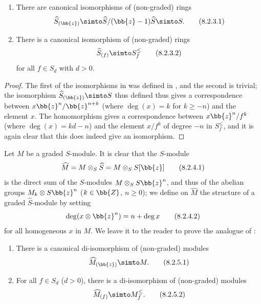 \begin{lemma}[8.2.3]
\label{II.8.2.3}
\begin{enumerate}
  \item[\rm{(i)}] There are canonical isomorphisms of (non-graded) rings
    \[
    \label{II.8.2.3.1}
      \widehat{S}_{(\bb{z})}
      \simto
      \widehat{S}/(\bb{z}-1)\widehat{S}
      \simto
      S.
    \tag{8.2.3.1}
    \]
  \item[\rm{(ii)}] There is a canonical isomorphism of (non-graded) rings
    \[
    \label{II.8.2.3.2}
      \widehat{S}_{(f)} \simto S_f^\leq
    \tag{8.2.3.2}
    \]
    for all $f\in S_d$ with $d>0$.
\end{enumerate}
\end{lemma}

\begin{proof}
The first of the isomorphisms in  was defined in , and the second is trivial;
the isomorphism $\widehat{S}_{(\bb{z})} \simto S$ thus defined thus gives a correspondence between $x\bb{z}^n/\bb{z}^{n+k}$ (where $\deg(x) = k$ for $k\geq -n$) and the element $x$.
The homomorphism  gives a correspondence between $x\bb{z}^n/f^k$ (where $\deg(x) = kd-n$) and the element $x/f^k$ of degree $-n$ in $S_f^\leq$, and it is again clear that this does indeed give an isomorphism.
\end{proof}

\begin{env}[8.2.4]
\label{II.8.2.4}
Let $M$ be a graded $S$-module.
It is clear that the $S$-module
\[
\label{II.8.2.4.1}
  \widehat{M} = M \otimes_S \widehat{S} = M \otimes_S S[\bb{z}]
\tag{8.2.4.1}
\]
is the direct sum of the $S$-modules $M\otimes_S S\bb{z}^n$, and thus of the abelian groups $M_k\otimes S\bb{z}^n$ ($k\in\bb{Z}$, $n\geq0$);
we define on $\widehat{M}$ the structure of a graded $\widehat{S}$-module by setting
\[
\label{II.8.2.4.2}
  \deg(x\otimes\bb{z}^n) = n+\deg x
\tag{8.2.4.2}
\]
for all homogeneous $x$ in $M$.
We leave it to the reader to prove the analogue of :
\end{env}

\begin{lemma}[8.2.5]
\label{II.8.2.5}
\begin{enumerate}
  \item[\rm{(i)}] There is a canonical di-isomorphism of (non-graded) modules
    \[
    \label{II.8.2.5.1}
      \widehat{M}_{(\bb{z})} \simto M.
    \tag{8.2.5.1}
    \]
  \item[\rm{(ii)}] For all $f\in S_d$ ($d>0$), there is a di-isomorphism of (non-graded) modules
    \[
    \label{II.8.2.5.2}
      \widehat{M}_{(f)} \simto M_f^\leq.
    \tag{8.2.5.2}
    \]
\end{enumerate}
\end{lemma}

